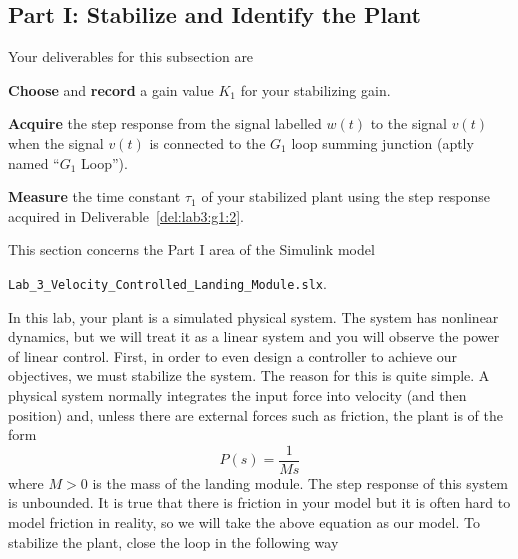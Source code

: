 \subsection{Part I: Stabilize and Identify the Plant}\label{Lab:3:Part:I}
Your deliverables for this subsection are
%
\begin{deliverable}[label={del:lab3:g1:1}]
  \textbf{Choose} and \textbf{record} a gain value \(K_1\) for your stabilizing gain.
\end{deliverable}
%
\begin{deliverable}[label={del:lab3:g1:2}]
   \textbf{Acquire} the step response from the signal labelled \(w(t)\) to the signal \(v(t)\) when the signal \(v(t)\) is connected to the \(G_1\) loop summing junction (aptly named ``\(G_1\) Loop'').
\end{deliverable}
%
\begin{deliverable}[label={del:lab3:g1:3}]
  \textbf{Measure} the time constant \(\tau_1\) of your stabilized plant using the step response acquired in Deliverable~\ref{del:lab3:g1:2}.
\end{deliverable}
%
This section concerns the Part I area of the Simulink model
\begin{center}
  \texttt{Lab\_3\_Velocity\_Controlled\_Landing\_Module.slx}.
\end{center}
In this lab, your plant is a simulated physical system.
The system has nonlinear dynamics, but we will treat it as a linear system and you will observe the power of linear control.
First, in order to even design a controller to achieve our objectives, we must stabilize the system.
The reason for this is quite simple. A physical system normally integrates the input force into velocity (and then position) and, unless there are external forces such as friction, the plant is of the form
\[
  P(s)
    =
      \frac{1}{M s}
\]
where \(M > 0\) is the mass of the landing module.
The step response of this system is unbounded.
It is true that there is friction in your model but it is often hard to model friction in reality, so we will take the above equation as our model.
To stabilize the plant, close the loop in the following way
%
